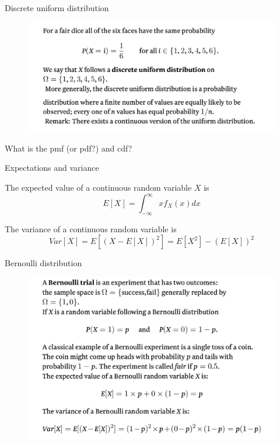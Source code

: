 \documentclass{beamer}
\begin{document}
\begin{frame}{Discrete uniform distribution}
	\begin{figure}
		\includegraphics[width=0.9\linewidth]{uniform.png}
	\end{figure}
	What is the pmf (or pdf?) and cdf?
\end{frame}

\begin{frame}{Expectations and variance}

	The expected value of a continuous random variable $X$ is
	\begin{equation*}
		E[X] = \int_{-\infty}^{\infty} x f_X(x) dx
	\end{equation*}

	The variance of a continuous random variable is
	\begin{equation*}
		Var[X] = E[(X-E[X])^2] = E[X^2] - (E[X])^2
	\end{equation*}

\end{frame}

\begin{frame}{Bernoulli distribution}
	\begin{figure}
                \includegraphics[width=0.9\linewidth]{bern.png}
        \end{figure}
\end{frame}
\end{document}
